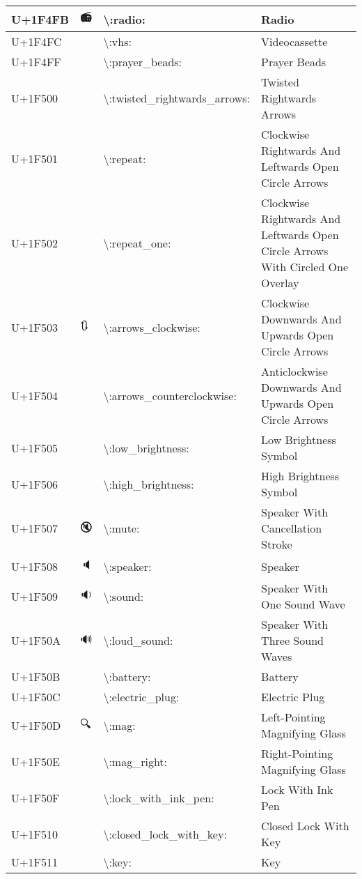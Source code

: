 \begin{table}[h]
\begin{tabulary}{\linewidth}{|L|L|L|L|}
\hline
U+1F4FB & 📻 & {\textbackslash}:radio: & Radio \\
\hline
U+1F4FC & 📼 & {\textbackslash}:vhs: & Videocassette \\
\hline
U+1F4FF & 📿 & {\textbackslash}:prayer\_beads: & Prayer Beads \\
\hline
U+1F500 & 🔀 & {\textbackslash}:twisted\_rightwards\_arrows: & Twisted Rightwards Arrows \\
\hline
U+1F501 & 🔁 & {\textbackslash}:repeat: & Clockwise Rightwards And Leftwards Open Circle Arrows \\
\hline
U+1F502 & 🔂 & {\textbackslash}:repeat\_one: & Clockwise Rightwards And Leftwards Open Circle Arrows With Circled One Overlay \\
\hline
U+1F503 & 🔃 & {\textbackslash}:arrows\_clockwise: & Clockwise Downwards And Upwards Open Circle Arrows \\
\hline
U+1F504 & 🔄 & {\textbackslash}:arrows\_counterclockwise: & Anticlockwise Downwards And Upwards Open Circle Arrows \\
\hline
U+1F505 & 🔅 & {\textbackslash}:low\_brightness: & Low Brightness Symbol \\
\hline
U+1F506 & 🔆 & {\textbackslash}:high\_brightness: & High Brightness Symbol \\
\hline
U+1F507 & 🔇 & {\textbackslash}:mute: & Speaker With Cancellation Stroke \\
\hline
U+1F508 & 🔈 & {\textbackslash}:speaker: & Speaker \\
\hline
U+1F509 & 🔉 & {\textbackslash}:sound: & Speaker With One Sound Wave \\
\hline
U+1F50A & 🔊 & {\textbackslash}:loud\_sound: & Speaker With Three Sound Waves \\
\hline
U+1F50B & 🔋 & {\textbackslash}:battery: & Battery \\
\hline
U+1F50C & 🔌 & {\textbackslash}:electric\_plug: & Electric Plug \\
\hline
U+1F50D & 🔍 & {\textbackslash}:mag: & Left-Pointing Magnifying Glass \\
\hline
U+1F50E & 🔎 & {\textbackslash}:mag\_right: & Right-Pointing Magnifying Glass \\
\hline
U+1F50F & 🔏 & {\textbackslash}:lock\_with\_ink\_pen: & Lock With Ink Pen \\
\hline
U+1F510 & 🔐 & {\textbackslash}:closed\_lock\_with\_key: & Closed Lock With Key \\
\hline
U+1F511 & 🔑 & {\textbackslash}:key: & Key \\

\end{tabulary}
\end{table}
